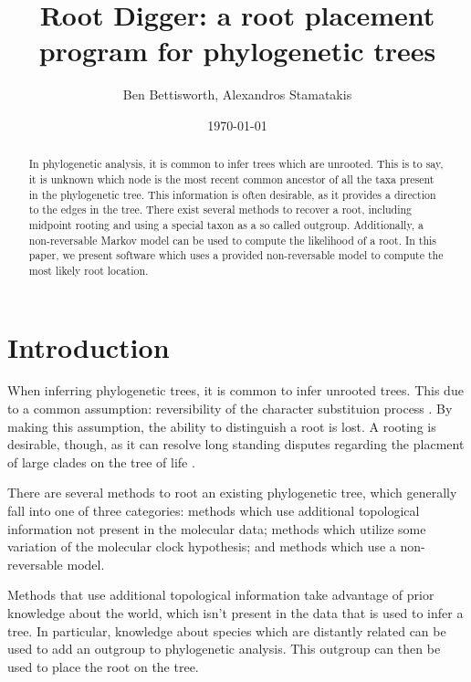 \documentclass{article}
\title{Root Digger: a root placement program for phylogenetic trees}
\author{Ben Bettisworth, Alexandros Stamatakis}
\date{\today}
\begin{document}
\begin{abstract}
  In phylogenetic analysis, it is common to infer trees which are unrooted. This
  is to say, it is unknown which node is the most recent common ancestor of all
  the taxa present in the phylogenetic tree. This information is often desirable,
  as it provides a direction to the edges in the tree. There exist several
  methods to recover a root, including midpoint rooting and using a special taxon
  as a so called outgroup. Additionally, a non-reversable Markov model can be used
  to compute the likelihood of a root. In this paper, we present software which
  uses a provided non-reversable model to compute the most likely root location.
\end{abstract}

\maketitle



\section{Introduction}


When inferring phylogenetic trees, it is common to infer unrooted trees. This
due to a common assumption: reversibility of the character substituion process
\cite{felsenstein_evolutionary_1981}. By making this assumption, the ability to
distinguish a root is lost. A rooting is desirable, though, as it can resolve
long standing disputes regarding the placment of large clades on the tree of
life \cite{dunn_animal_2014}.

There are several methods to root an existing phylogenetic tree, which generally
fall into one of three categories: methods which use additional topological
information not present in the molecular data; methods which utilize some
variation of the molecular clock hypothesis; and methods which use a
non-reversable model.

Methods that use additional topological information take advantage of prior
knowledge about the world, which isn't present in the data that is used to infer
a tree. In particular, knowledge about species which are distantly related can
be used to add an outgroup to phylogenetic analysis. This outgroup can then be
used to place the root on the tree.
\end{document}

